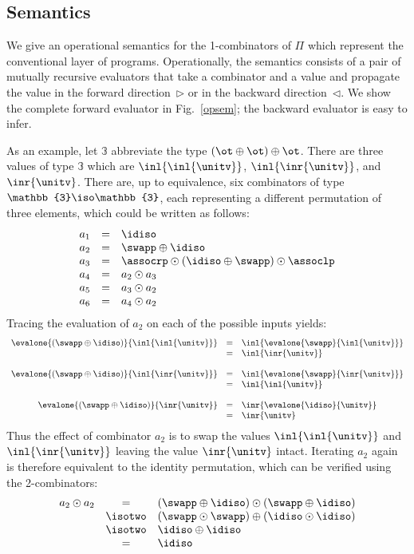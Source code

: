 \subsection{Semantics}
\label{sec:pisem}

We give an operational semantics for the 1-combinators of $\Pi$ which
represent the conventional layer of programs.  Operationally, the
semantics consists of a pair of mutually recursive evaluators that
take a combinator and a value and propagate the value in the forward
direction~$\triangleright$ or in the backward
direction~$\triangleleft$. We show the complete forward evaluator in
Fig.~\ref{opsem}; the backward evaluator is easy to infer.

As an example, let $\mathbb{3}$ abbreviate the type
$(\ot \oplus \ot) \oplus \ot$. There are three values of type
$\mathbb{3}$ which are $\inl{\inl{\unitv}}$, $\inl{\inr{\unitv}}$, and
$\inr{\unitv}$. There are, up to equivalence, six combinators of type
$\mathbb{3} \iso \mathbb{3}$, each representing a different
permutation of three elements, which could be written as follows:
\[\begin{array}{rcl}
a_1 &=& \idiso \\
a_2 &=& \swapp \oplus \idiso \\
a_3 &=& \assocrp \odot (\idiso \oplus \swapp) \odot \assoclp \\
a_4 &=& a_2 \odot a_3 \\
a_5 &=& a_3 \odot a_2 \\
a_6 &=& a_4 \odot a_2
\end{array}\]
Tracing the evaluation of $a_2$ on each of the possible inputs yields:
\[\begin{array}{rcl}
\evalone{(\swapp\oplus\idiso)}{\inl{\inl{\unitv}}} &=& \inl{\evalone{\swapp}{\inl{\unitv}}} \\
&=& \inl{\inr{\unitv}} \\
\\
\evalone{(\swapp\oplus\idiso)}{\inl{\inr{\unitv}}} &=& \inl{\evalone{\swapp}{\inr{\unitv}}} \\
&=& \inl{\inl{\unitv}} \\
\\
\evalone{(\swapp\oplus\idiso)}{\inr{\unitv}} &=& \inr{\evalone{\idiso}{\unitv}} \\
&=& \inr{\unitv}
\end{array}\]
Thus the effect of combinator $a_2$ is to swap the values
$\inl{\inl{\unitv}}$ and $\inl{\inr{\unitv}}$ leaving the value
$\inr{\unitv}$ intact. Iterating $a_2$ again is therefore equivalent
to the identity permutation, which can be verified using the 
2-combinators:
\[\begin{array}{rcl}
a_2 \odot a_2 &=& (\swapp \oplus \idiso) \odot (\swapp \oplus \idiso) \\
&\isotwo& (\swapp \odot \swapp) \oplus (\idiso \odot \idiso) \\
&\isotwo& \idiso \oplus \idiso \\
&=& \idiso
\end{array}\]

